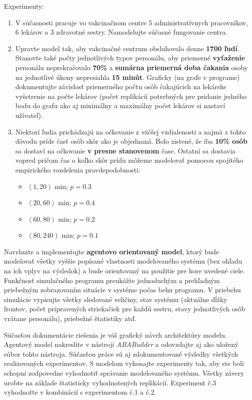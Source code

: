 \documentclass[letterpaper]{article}
\begin{document}
	\noindent Experimenty:
	\begin{enumerate}
		\item V súčasnosti pracuje vo vakcinačnom centre 5 administratívnych pracovníkov, 6 lekárov a 3 zdravotné sestry. Namodelujte súčasné fungovanie centra.
		\item Upravte model tak, aby vakcinačné centrum obsluhovalo denne \textbf{1700 ľudí}. Stanovte také počty jednotlivých typov personálu, aby priemerné \textbf{vyťaženie} personálu neprekračovalo \textbf{70\%} a \textbf{sumárna priemerná doba čakania} osoby na jednotlivé úkony nepresiahla \textbf{15 minút}. Graficky (na grafe v programe) dokumentujte závislosť priemerného počtu osôb čakajúcich na lekárske vyšetrenie na počte lekárov (počet replikácií potrebných pre pridanie jedného bodu do grafu ako aj minimálny a maximálny počet lekárov si nastaví užívateľ). 
		\item Niektorí ľudia prichádzajú na očkovanie z väčšej vzdialenosti a najmä z tohto dôvodu príde časť osôb skôr ako je objednaná. Bolo zistené, že iba \textbf{10\% osôb} sa dostaví na očkovanie \textbf{v presne stanovenom} čase. Ostatní sa dostavia vopred pričom čas o koľko skôr prídu môžeme modelovať pomocou spojitého empirického rozdelenia pravdepodobnosti: 
		\begin{itemize}
			\item $ \left\langle 1, 20 \right) $ min; $ p = 0.3 $
			\item $ \left\langle 20, 60 \right) $ min; $ p = 0.4 $
			\item $ \left\langle 60, 80 \right) $ min; $ p = 0.2 $
			\item $ \left\langle 80, 240 \right) $ min; $ p = 0.1 $
		\end{itemize}
	\end{enumerate}
	
	Navrhnite a implementujte \textbf{agentovo orientovaný model}, ktorý bude modelovať všetky vyššie popísané vlastnosti modelovaného systému (bez ohľadu na ich vplyv na výsledok) a bude orientovaný na použitie pre hore uvedené ciele. Funkčnosť simulačného programu preukážte jednoduchým a prehľadným priebežným zobrazovaním situácie v systéme počas behu programu. V priebehu simulácie vypisujte všetky sledované veličiny, stav systému (aktuálne dĺžky frontov, počet pripravených striekačiek pre každú sestru, stavy jednotlivých osôb vrátane personálu), priebežné štatistiky atď.
	
	Súčasťou dokumentácie riešenia je váš grafický návrh architektúry modelu. Agentový model nakreslite v nástroji \textit{ABABuilder} a odovzdajte aj ako uložený súbor tohto nástroja. Súčasťou práce sú aj zdokumentované výsledky všetkých realizovaných experimentov. S modelom vykonajte experimenty tak, aby ste boli schopní zodpovedne vyhodnotiť správanie modelovaného systému. Všetky závery urobte na základe štatisticky vyhodnotených replikácií. Experiment č.3 vyhodnoťte v kombinácií s experimentom č.1 a č.2.
	
\end{document}
